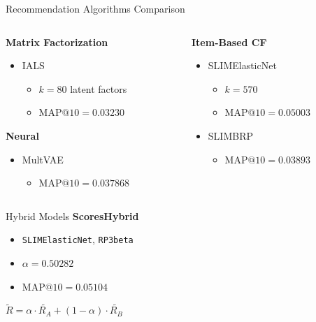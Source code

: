 \documentclass{beamer}
\begin{document}
\begin{frame}{Recommendation Algorithms Comparison}
  \begin{columns}[t]
    \begin{column}{0.5\textwidth}
      \textbf{Matrix Factorization}
      \begin{itemize}
        \item IALS
        \begin{itemize}
          \item $k=80$ latent factors
          \item $\text{MAP@}10=0.03230$
        \end{itemize}
      \end{itemize}
      \textbf{Neural}
      \begin{itemize}
        \item MultVAE
        \begin{itemize}
          \item $\text{MAP@}10=0.037868$
        \end{itemize}
      \end{itemize}
    \end{column}
    
    \begin{column}{0.5\textwidth}
      \textbf{Item-Based CF}
      \begin{itemize}
        \item SLIMElasticNet
        \begin{itemize}
            \item $k=570$
            \item $\text{MAP@}10=0.05003$
        \end{itemize}
        \item SLIMBRP
        \begin{itemize}
            \item $\text{MAP@}10=0.03893$
        \end{itemize}
      \end{itemize}
    \end{column}
  \end{columns}
\end{frame}


\begin{frame}{Hybrid Models}
  \textbf{ScoresHybrid}
  \begin{itemize}
    \item \texttt{SLIMElasticNet}, \texttt{RP3beta}
    \item $\alpha=0.50282$
    \item $\text{MAP@}10=0.05104$
  \end{itemize}
  \vspace{1cm}
  \begin{center}
    $\tilde{R} = \alpha \cdot \tilde{R_{A}} + (1-\alpha) \cdot \tilde{R_{B}}$
  \end{center}
\end{frame}
\end{document}

